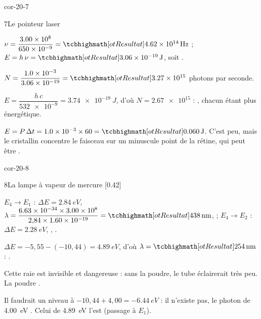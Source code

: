 \begin{blocLivre}{cor-20-7}
\begin{corrige}{7}{Le pointeur laser}
\begin{questions}
\item $\nu=\dfrac{\num{3,00e8}}{\num{650e-9}}=\res{\qty{4,62e14}{Hz}}$ ; $E=h\,\nu=\res{\qty{3,06e-19}{J}}$, soit .
\item $N=\dfrac{\num{1,0e-3}}{\num{3,06e-19}}=\res{\num{3,27e15}}$ photons par seconde.
\item $E=\dfrac{h\,c}{\num{532e-9}}=\qty{3,74e-19}{J}$, d'où $N=\num{2,67e15}$ : , chacun étant plus énergétique.
\item $E=P\,\Delta t=\num{1,0e-3}\times60=\res{\qty{0,060}{J}}$. C'est peu, mais le cristallin concentre le faisceau sur un minuscule point de la
rétine, qui peut être .
\end{questions}
\end{corrige}
\end{blocLivre}
\begin{blocLivre}{cor-20-8}
\begin{corrige}{8}{La lampe à vapeur de mercure}
[0.42]{\begin{questions}
\item $E_4\to E_1$ : $\Delta E=\qty{2,84}{eV}$, $\lambda=\dfrac{\num{6,63e-34}\times\num{3,00e8}}{2{,}84\times\num{1,60e-19}}=\res{\qty{438}{nm}}$,  ; $E_4\to E_2$ : $\Delta E=\qty{2,28}{eV}$, , .
\item $\Delta E=-5{,}55-(-10{,}44)=\qty{4,89}{eV}$, d'où $\lambda=\res{\qty{254}{nm}}$ : .
\item Cette raie est invisible et dangereuse : sans la poudre, le tube éclairerait très peu. La poudre .
\item Il faudrait un niveau à $-10{,}44+4{,}00=\qty{-6,44}{eV}$ : il n'existe pas, le photon de \qty{4,00}{eV} . Celui de
\qty{4,89}{eV} l'est (passage à $E_1$).
\end{questions}}
\end{corrige}
\end{blocLivre}
